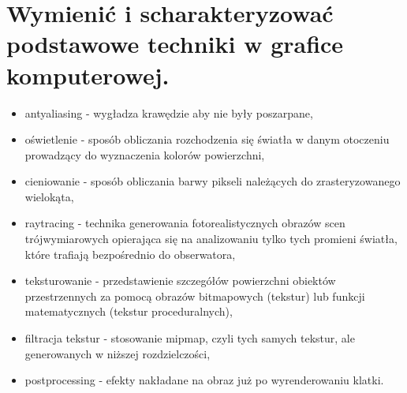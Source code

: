 \documentclass[12pt,a4paper]{article}
\begin{document}
	\section{Wymienić i scharakteryzować podstawowe techniki w grafice komputerowej.}
	\begin{itemize}
		\item antyaliasing - wygładza krawędzie aby nie były poszarpane,
		\item oświetlenie - sposób obliczania rozchodzenia się światła w danym otoczeniu prowadzący do wyznaczenia kolorów powierzchni, 
		\item cieniowanie - sposób obliczania barwy pikseli należących do zrasteryzowanego wielokąta,
		\item raytracing - technika generowania fotorealistycznych obrazów scen trójwymiarowych opierająca się na analizowaniu tylko tych promieni światła, które trafiają bezpośrednio do obserwatora, 
		\item teksturowanie - przedstawienie szczegółów powierzchni obiektów przestrzennych za pomocą obrazów bitmapowych (tekstur) lub funkcji matematycznych (tekstur proceduralnych),
		\item filtracja tekstur - stosowanie mipmap, czyli tych samych tekstur, ale generowanych w niższej rozdzielczości,
		\item postprocessing - efekty nakładane na obraz już po wyrenderowaniu klatki.
	\end{itemize}
\end{document}
